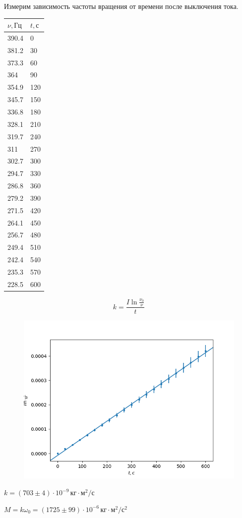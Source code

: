 Измерим зависимость частоты вращения от времени после выключения тока.
\begin{table}[!ht]
    \centering
    \begin{tabular}{|l|l|}
    \hline
        $\nu,\text{Гц}$ & $t,\text{с}$ \\ \hline
        390.4 & 0 \\ \hline
        381.2 & 30 \\ \hline
        373.3 & 60 \\ \hline
        364 & 90 \\ \hline
        354.9 & 120 \\ \hline
        345.7 & 150 \\ \hline
        336.8 & 180 \\ \hline
        328.1 & 210 \\ \hline
        319.7 & 240 \\ \hline
        311 & 270 \\ \hline
        302.7 & 300 \\ \hline
        294.7 & 330 \\ \hline
        286.8 & 360 \\ \hline
        279.2 & 390 \\ \hline
        271.5 & 420 \\ \hline
        264.1 & 450 \\ \hline
        256.7 & 480 \\ \hline
        249.4 & 510 \\ \hline
        242.4 & 540 \\ \hline
        235.3 & 570 \\ \hline
        228.5 & 600 \\ \hline
    \end{tabular}
\end{table}

\[k=\frac{I\ln\frac{\nu_0}{\nu}}{t}\]

\begin{figure}[ht!]
    \centering\includegraphics[width=0.8\linewidth]{img/pltm.png}
\end{figure}

$k=\left(703\pm 4\right)\cdot 10^{-9}\,\text{кг}\cdot\text{м}^2/\text{с}$

$M=k\omega_0=\left(1725\pm 99\right)\cdot 10^{-6}\,\text{кг}\cdot\text{м}^2/\text{с}^2$
